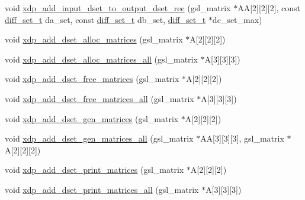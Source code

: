 \begin{DoxyCompactItemize}
\item 
void \hyperlink{xdp-add-diff-set_8hh_a6ee970575419b828471a4590df91acf8}{xdp\-\_\-add\-\_\-input\-\_\-dset\-\_\-to\-\_\-output\-\_\-dset\-\_\-rec} (gsl\-\_\-matrix $\ast$\-A\-A\mbox{[}2\mbox{]}\mbox{[}2\mbox{]}\mbox{[}2\mbox{]}, const \hyperlink{structdiff__set__t}{diff\-\_\-set\-\_\-t} da\-\_\-set, const \hyperlink{structdiff__set__t}{diff\-\_\-set\-\_\-t} db\-\_\-set, \hyperlink{structdiff__set__t}{diff\-\_\-set\-\_\-t} $\ast$dc\-\_\-set\-\_\-max)
\item 
void \hyperlink{xdp-add-diff-set_8hh_aaaab7f820c7719fe4bebda5f972f46ac}{xdp\-\_\-add\-\_\-dset\-\_\-alloc\-\_\-matrices} (gsl\-\_\-matrix $\ast$\-A\mbox{[}2\mbox{]}\mbox{[}2\mbox{]}\mbox{[}2\mbox{]})
\item 
void \hyperlink{xdp-add-diff-set_8hh_a3c2debae4a0c3272990e3927f73c2f2f}{xdp\-\_\-add\-\_\-dset\-\_\-alloc\-\_\-matrices\-\_\-all} (gsl\-\_\-matrix $\ast$\-A\mbox{[}3\mbox{]}\mbox{[}3\mbox{]}\mbox{[}3\mbox{]})
\item 
void \hyperlink{xdp-add-diff-set_8hh_a9de10d748f2c35c47ec10e0f8aede4ce}{xdp\-\_\-add\-\_\-dset\-\_\-free\-\_\-matrices} (gsl\-\_\-matrix $\ast$\-A\mbox{[}2\mbox{]}\mbox{[}2\mbox{]}\mbox{[}2\mbox{]})
\item 
void \hyperlink{xdp-add-diff-set_8hh_a71dd8f70100ab3eaaa2dbc2ff0394507}{xdp\-\_\-add\-\_\-dset\-\_\-free\-\_\-matrices\-\_\-all} (gsl\-\_\-matrix $\ast$\-A\mbox{[}3\mbox{]}\mbox{[}3\mbox{]}\mbox{[}3\mbox{]})
\item 
void \hyperlink{xdp-add-diff-set_8hh_a27a7143f33c69fc9fddb78e9677435ad}{xdp\-\_\-add\-\_\-dset\-\_\-gen\-\_\-matrices} (gsl\-\_\-matrix $\ast$\-A\mbox{[}2\mbox{]}\mbox{[}2\mbox{]}\mbox{[}2\mbox{]})
\item 
void \hyperlink{xdp-add-diff-set_8hh_a4690a51a4f31ebebe2f3d96367a0f977}{xdp\-\_\-add\-\_\-dset\-\_\-gen\-\_\-matrices\-\_\-all} (gsl\-\_\-matrix $\ast$\-A\-A\mbox{[}3\mbox{]}\mbox{[}3\mbox{]}\mbox{[}3\mbox{]}, gsl\-\_\-matrix $\ast$\-A\mbox{[}2\mbox{]}\mbox{[}2\mbox{]}\mbox{[}2\mbox{]})
\item 
void \hyperlink{xdp-add-diff-set_8hh_a86dbfb9fecf193fc3438437d34823b39}{xdp\-\_\-add\-\_\-dset\-\_\-print\-\_\-matrices} (gsl\-\_\-matrix $\ast$\-A\mbox{[}2\mbox{]}\mbox{[}2\mbox{]}\mbox{[}2\mbox{]})
\item 
void \hyperlink{xdp-add-diff-set_8hh_a3716a9725156ea1dfec064f49a098d73}{xdp\-\_\-add\-\_\-dset\-\_\-print\-\_\-matrices\-\_\-all} (gsl\-\_\-matrix $\ast$\-A\mbox{[}3\mbox{]}\mbox{[}3\mbox{]}\mbox{[}3\mbox{]})
\item 

\end{DoxyCompactItemize}
